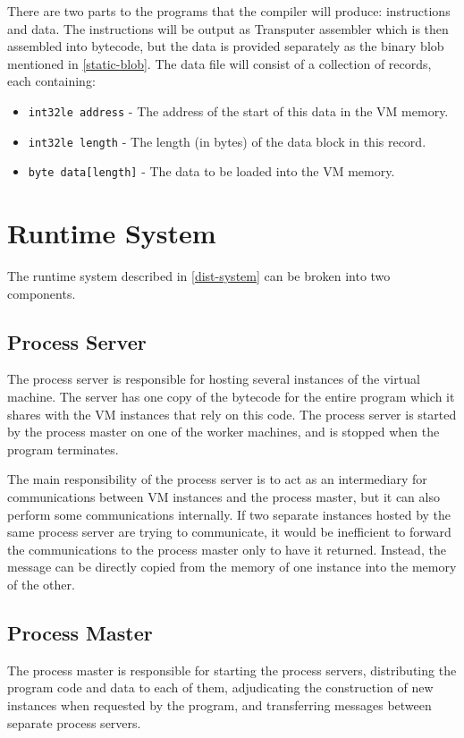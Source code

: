 There are two parts to the programs that the compiler will produce:
instructions and data. The instructions will be output as Transputer assembler
which is then assembled into bytecode, but the data is provided separately as
the binary blob mentioned in \ref{static-blob}. The data file will consist of a
collection of records, each containing:
\begin{itemize}
  \item
    \texttt{int32le address} - The address of the start of this data in the VM
    memory.
  \item
    \texttt{int32le length} - The length (in bytes) of the data block in this
    record.
  \item
    \texttt{byte data[length]} - The data to be loaded into the VM memory.
\end{itemize}

\section{Runtime System}

The runtime system described in \ref{dist-system} can be broken into two
components.

\subsection{Process Server}

The process server is responsible for hosting several instances of the virtual
machine. The server has one copy of the bytecode for the entire program which it
shares with the VM instances that rely on this code. The process server is
started by the process master on one of the worker machines, and is stopped when
the program terminates.

The main responsibility of the process server is to act as an intermediary for
communications between VM instances and the process master, but it can also
perform some communications internally. If two separate instances hosted by the
same process server are trying to communicate, it would be inefficient to
forward the communications to the process master only to have it returned.
Instead, the message can be directly copied from the memory of one instance into
the memory of the other.

\subsection{Process Master}

The process master is responsible for starting the process servers, distributing
the program code and data to each of them, adjudicating the construction of new
instances when requested by the program, and transferring messages between
separate process servers.
